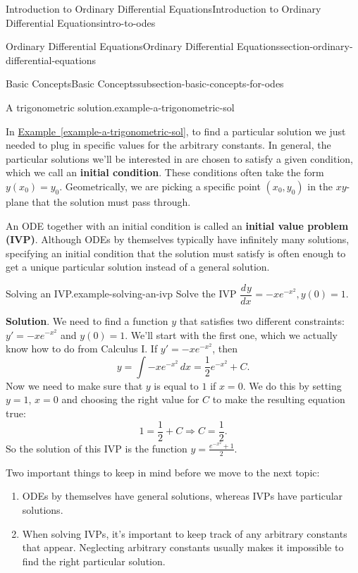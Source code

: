 \documentclass[oneside,10pt,]{book}
\newcommand{\terminology}[1]{\textbf{#1}}
\numberwithin{equation}{section}
\newcommand{\dv}[3][]{\dfrac{d^{#1} #2}{d #3^{#1}}}
\begin{document}
\begin{chapterptx}{Introduction to Ordinary Differential Equations}{}{Introduction to Ordinary Differential Equations}{}{}{intro-to-odes}
\begin{sectionptx}{Ordinary Differential Equations}{}{Ordinary Differential Equations}{}{}{section-ordinary-differential-equations}
\begin{subsectionptx}{Basic Concepts}{}{Basic Concepts}{}{}{subsection-basic-concepts-for-odes}
\begin{example}{A trigonometric solution.}{example-a-trigonometric-sol}
\end{example}
\hypertarget{p-19}{}%
In \hyperref[example-a-trigonometric-sol]{Example~\ref{example-a-trigonometric-sol}}, to find a particular solution we just needed to plug in specific values for the arbitrary constants. In general, the particular solutions we'll be interested in are chosen to satisfy a given condition, which we call an \terminology{initial condition}. These conditions often take the form \(y(x_{0}) = y_{0}\). Geometrically, we are picking a specific point \((x_{0},y_{0})\) in the \(xy\)-plane that the solution must pass through.%
\par
\hypertarget{p-20}{}%
An ODE together with an initial condition is called an \terminology{initial value problem (IVP)}. Although ODEs by themselves typically have infinitely many solutions, specifying an initial condition that the solution must satisfy is often enough to get a unique particular solution instead of a general solution.%
\begin{example}{Solving an IVP.}{example-solving-an-ivp}%
\hypertarget{p-21}{}%
Solve the IVP \(\dv{y}{x} = -xe^{-x^{2}}, y(0)=1\).%
\par\smallskip%
\noindent\textbf{Solution}.\hypertarget{solution-3}{}\quad%
\hypertarget{p-22}{}%
We need to find a function \(y\) that satisfies two different constraints: \(y' = -xe^{-x^{2}}\) and \(y(0)=1\). We'll start with the first one, which we actually know how to do from Calculus I. If \(y' = -xe^{-x^{2}}\), then%
\begin{equation*}
y = \int -xe^{-x^{2}}\,dx = \frac{1}{2}e^{-x^{2}}+C.
\end{equation*}
Now we need to make sure that \(y\) is equal to \(1\) if \(x=0\). We do this by setting \(y=1\), \(x=0\) and choosing the right value for \(C\) to make the resulting equation true:%
\begin{equation*}
1 = \frac{1}{2} + C \Rightarrow C = \frac{1}{2}.
\end{equation*}
So the solution of this IVP is the function \(y = \frac{e^{-x^{2}}+1}{2}\).%
\end{example}
\hypertarget{p-23}{}%
Two important things to keep in mind before we move to the next topic:\leavevmode%
\begin{enumerate}
\item\hypertarget{li-3}{}\hypertarget{p-24}{}%
ODEs by themselves have general solutions, whereas IVPs have particular solutions.%
\item\hypertarget{li-4}{}\hypertarget{p-25}{}%
When solving IVPs, it's important to keep track of any arbitrary constants that appear. Neglecting arbitrary constants usually makes it impossible to find the right particular solution.%

\end{enumerate}
\end{subsectionptx}
\end{sectionptx}
\end{chapterptx}
\end{document}
